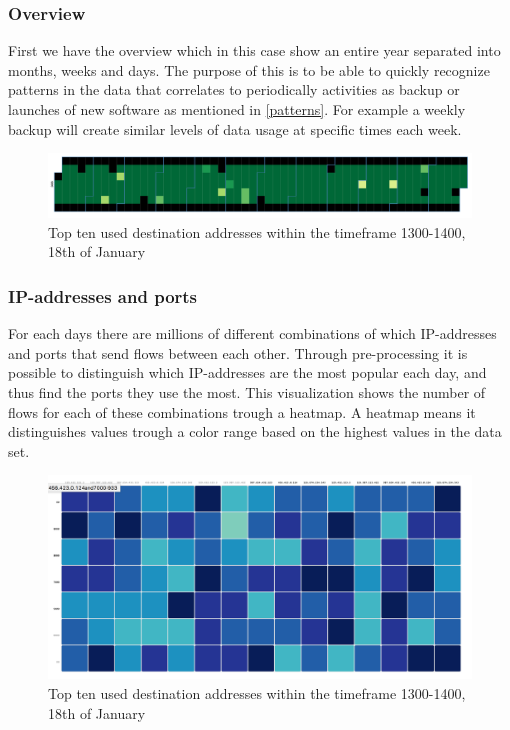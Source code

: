 \subsubsection{Overview}
First we have the overview which in this case show an entire year separated into months, weeks and days. 
The purpose of this is to be able to quickly recognize patterns in the data that correlates to periodically activities as backup or launches of new software as mentioned in \ref{patterns}. For example a weekly backup will create similar levels of data usage at specific times each week. 

\begin{figure}[h!]
\includegraphics[scale=0.4]{yearly}
\caption{Top ten used destination addresses within the timeframe 1300-1400, 18th of January}
\end{figure}

\subsubsection{IP-addresses and ports}
\label{sec:heatmap}
For each days there are millions of different combinations of which IP-addresses and ports that send flows between each other. Through pre-processing it is possible to distinguish which IP-addresses are the most popular each day, and thus find the ports they use the most. This visualization shows the number of flows for each of these combinations trough a heatmap. A heatmap means it distinguishes values trough a color range based on the highest values in the data set.

\begin{figure}[h!]
\includegraphics[scale=0.35]{ip_ports}
\caption{Top ten used destination addresses within the timeframe 1300-1400, 18th of January}
\end{figure}

